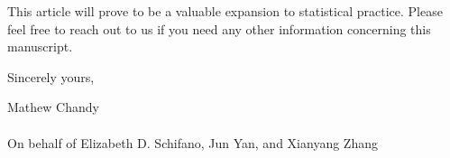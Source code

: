 \documentclass{article}
\begin{document}
This article will prove to be a valuable expansion to statistical practice.
Please feel free to reach out to us if you need any other information concerning 
this manuscript.

\bigskip

Sincerely yours,

\vspace{50pt}

Mathew Chandy\\ \\On behalf of Elizabeth D. Schifano, Jun Yan, and 
Xianyang Zhang
\end{document}
